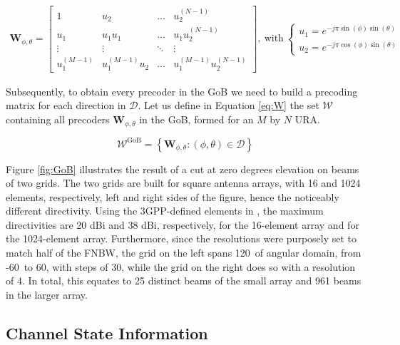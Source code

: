 \begin{align} \label{eq:prec_func}
    \bm{W}_{\phi, \theta}= 
    \begin{bmatrix}
        1 & u_2 & \dots & u_2^{(N-1)}\\
        u_1 & u_1 u_1 & \dots & u_1 u_2^{(N-1)}\\
        \vdots & \vdots & \ddots & \vdots\\
        u_1^{(M-1)} & u_1^{(M-1)} u_2 & \dots & u_1^{(M-1)} u_2^{(N-1)}
    \end{bmatrix}, \ \text{with} \
    \begin{cases}
        u_1 = e^{-j \pi \sin(\phi) \sin(\theta)} \\
        u_2 = e^{-j \pi \cos(\phi) \sin(\theta)}
    \end{cases}
\end{align}


Subsequently, to obtain every precoder in the GoB we need to build a precoding matrix for each direction in $\mathcal{D}$. Let us define in Equation \eqref{eq:W} the set $\mathcal{W}$ containing all precoders $\bm{W}_{\phi, \theta}$ in the GoB, formed for an $M$ by $N$ \ac{URA}.

\begin{equation} \label{eq:W}
    \mathcal{W}^\text{GoB} = \left\{ \bm{W}_{\phi, \theta} : (\phi, \theta) \in \mathcal{D}\right\}
\end{equation}

Figure \ref{fig:GoB} illustrates the result of a cut at zero degrees elevation on beams of two grids. The two grids are built for square antenna arrays, with 16 and 1024 elements, respectively, left and right sides of the figure, hence the noticeably different directivity. Using the 3GPP-defined elements in \cite{3gpp_antennas}, the maximum directivities are 20 dBi and 38 dBi, respectively, for the 16-element array and for the 1024-element array. Furthermore, since the resolutions were purposely set to match half of the \ac{FNBW}, the grid on the left spans 120\textdegree \ of angular domain, from -60\textdegree \ to 60\textdegree, with steps of 30\textdegree, while the grid on the right does so with a resolution of 4\textdegree. In total, this equates to 25 distinct beams of the small array and 961 beams in the larger array.



\subsection{Channel State Information}

